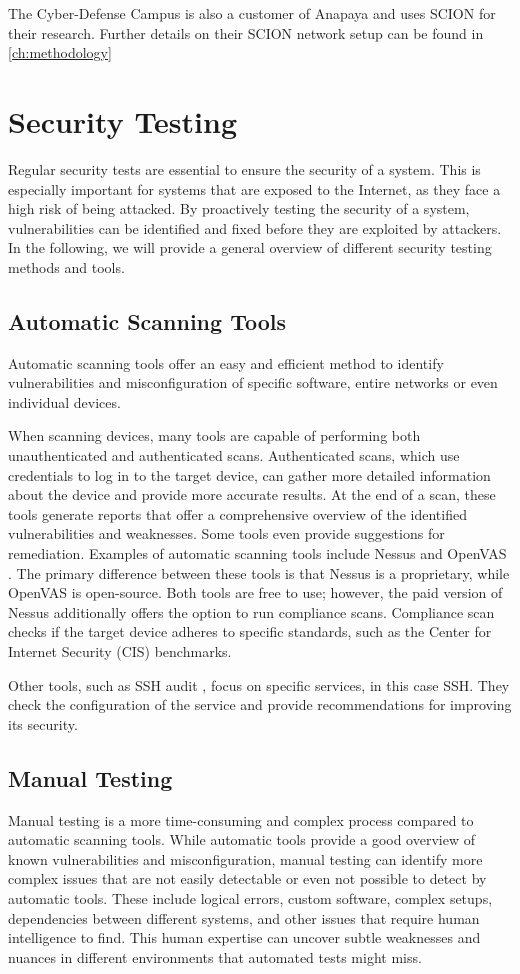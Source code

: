 The Cyber-Defense Campus is also a customer of Anapaya and uses SCION for their research.
Further details on their SCION network setup can be found in \cref{ch:methodology}


\section{Security Testing}
\label{sec:security_testing}
Regular security tests are essential to ensure the security of a system.
This is especially important for systems that are exposed to the Internet, as they face a high risk of being attacked.
By proactively testing the security of a system, vulnerabilities can be identified and fixed before they are exploited by attackers.
In the following, we will provide a general overview of different security testing methods and tools.

\subsection{Automatic Scanning Tools}
Automatic scanning tools offer an easy and efficient method to identify vulnerabilities and misconfiguration of specific software, entire networks or even individual devices.

When scanning devices, many tools are capable of performing both unauthenticated and authenticated scans.
Authenticated scans, which use credentials to log in to the target device, can gather more detailed information about the device and provide more accurate results.
At the end of a scan, these tools generate reports that offer a comprehensive overview of the identified vulnerabilities and weaknesses.
Some tools even provide suggestions for remediation.
Examples of automatic scanning tools include Nessus \cite{nessus} and OpenVAS \cite{openvas}.
The primary difference between these tools is that Nessus is a proprietary, while OpenVAS is open-source.
Both tools are free to use; however, the paid version of Nessus additionally offers the option to run compliance scans.
Compliance scan checks if the target device adheres to specific standards, such as the Center for Internet Security (CIS) benchmarks.

Other tools, such as SSH audit \cite{sshaudit}, focus on specific services, in this case SSH.
They check the configuration of the service and provide recommendations for improving its security.


\subsection{Manual Testing}
Manual testing is a more time-consuming and complex process compared to automatic scanning tools.
While automatic tools provide a good overview of known vulnerabilities and misconfiguration, manual testing can identify more complex issues that are not easily detectable or even not possible to detect by automatic tools.
These include logical errors, custom software, complex setups, dependencies between different systems, and other issues that require human intelligence to find.
This human expertise can uncover subtle weaknesses and nuances in different environments that automated tests might miss.


